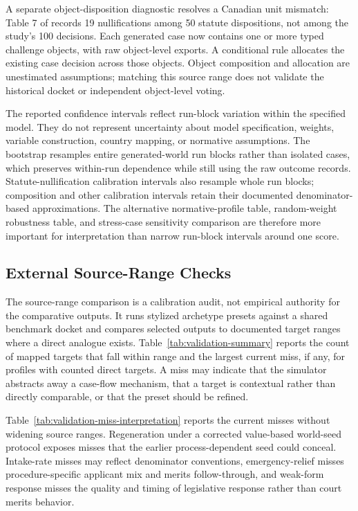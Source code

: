 \documentclass[
  journal=small,
  manuscript=research-article,
  year=2026
]{cup-journal}
\begin{document}


A separate object-disposition diagnostic resolves a Canadian unit mismatch: Table 7 of \citet{morton1992} records 19 nullifications among 50 statute dispositions, not among the study's 100 decisions. Each generated case now contains one or more typed challenge objects, with raw object-level exports. A conditional rule allocates the existing case decision across those objects. Object composition and allocation are unestimated assumptions; matching this source range does not validate the historical docket or independent object-level voting.

The reported confidence intervals reflect run-block variation within the specified model. They do not represent uncertainty about model specification, weights, variable construction, country mapping, or normative assumptions. The bootstrap resamples entire generated-world run blocks rather than isolated cases, which preserves within-run dependence while still using the raw outcome records. Statute-nullification calibration intervals also resample whole run blocks; composition and other calibration intervals retain their documented denominator-based approximations. The alternative normative-profile table, random-weight robustness table, and stress-case sensitivity comparison are therefore more important for interpretation than narrow run-block intervals around one score.

\subsection{External Source-Range Checks}

The source-range comparison is a calibration audit, not empirical authority for the comparative outputs. It runs stylized archetype presets against a shared benchmark docket and compares selected outputs to documented target ranges where a direct analogue exists. Table~\ref{tab:validation-summary} reports the count of mapped targets that fall within range and the largest current miss, if any, for profiles with counted direct targets. A miss may indicate that the simulator abstracts away a case-flow mechanism, that a target is contextual rather than directly comparable, or that the preset should be refined.



Table~\ref{tab:validation-miss-interpretation} reports the current misses without widening source ranges. Regeneration under a corrected value-based world-seed protocol exposes misses that the earlier process-dependent seed could conceal. Intake-rate misses may reflect denominator conventions, emergency-relief misses procedure-specific applicant mix and merits follow-through, and weak-form response misses the quality and timing of legislative response rather than court merits behavior.
\end{document}
